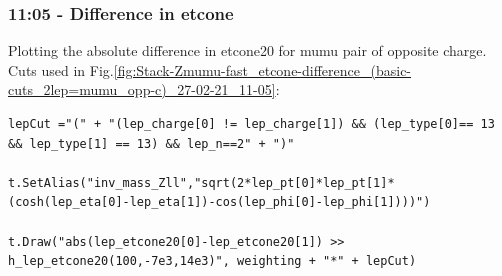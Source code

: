 \subsubsection*{11:05 - Difference in etcone}
Plotting the absolute difference in etcone20 for mumu pair of opposite charge.
\\
Cuts used in Fig.\ref{fig:Stack-Zmumu-fast_etcone-difference_(basic-cuts_2lep=mumu_opp-c)_27-02-21_11-05}:
\begin{lstlisting}
lepCut ="(" + "(lep_charge[0] != lep_charge[1]) && (lep_type[0]== 13 && lep_type[1] == 13) && lep_n==2" + ")"    
    
t.SetAlias("inv_mass_Zll","sqrt(2*lep_pt[0]*lep_pt[1]*(cosh(lep_eta[0]-lep_eta[1])-cos(lep_phi[0]-lep_phi[1])))")
   
t.Draw("abs(lep_etcone20[0]-lep_etcone20[1]) >> h_lep_etcone20(100,-7e3,14e3)", weighting + "*" + lepCut)
\end{lstlisting}

